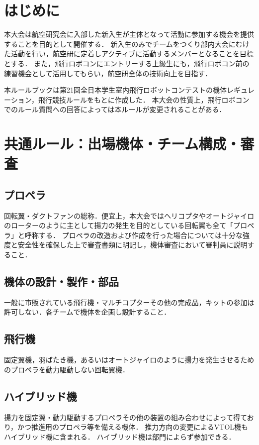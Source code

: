 \documentclass[a4paper,12pt,oneside]{jsarticle}
\begin{document}

\newpage
\tableofcontents
\newpage

\section{はじめに}
本大会は航空研究会に入部した新入生が主体となって活動に参加する機会を提供することを目的として開催する．
新入生のみでチームをつくり部内大会にむけた活動を行い，航空研に定着しアクティブに活動するメンバーとなることを目標とする．
また，飛行ロボコンにエントリーする上級生にも，飛行ロボコン前の練習機会として活用してもらい，航空研全体の技術向上を目指す．


本ルールブックは第21回全日本学生室内飛行ロボットコンテストの機体レギュレーション，飛行競技ルールをもとに作成した．
本大会の性質上，飛行ロボコンでのルール質問への回答によっては本ルールが変更されることがある．

\section{共通ルール：出場機体・チーム構成・審査}
\subsection{プロペラ}
回転翼・ダクトファンの総称．便宜上，本大会ではヘリコプタやオートジャイロのローターのように主として揚力の発生を目的としている回転翼も全て「プロペラ」と呼称する．
プロペラの改造および作成を行った場合については十分な強度と安全性を確保した上で審査書類に明記し，機体審査において審判員に説明すること．

\subsection{機体の設計・製作・部品}
一般に市販されている飛行機・マルチコプターその他の完成品，キットの参加は許可しない．各チームで機体を企画し設計すること．

\subsection{飛行機}
固定翼機，羽ばたき機，あるいはオートジャイロのように揚力を発生させるためのプロペラを動力駆動しない回転翼機．
\subsection{ハイブリッド機}
揚力を固定翼・動力駆動するプロペラその他の装置の組み合わせによって得ており，かつ推進用のプロペラ等を備える機体．
推力方向の変更によるVTOL機もハイブリッド機に含まれる．
ハイブリッド機は部門によらず参加できる．
\end{document}
